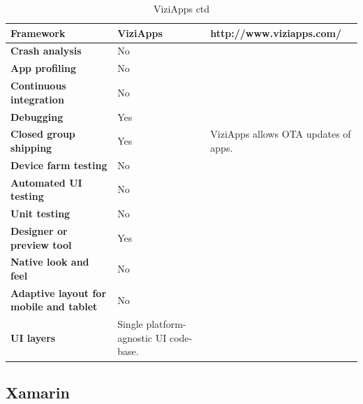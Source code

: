 \documentclass[english,master,public,dept460,male,cpdeclaration,oneside]{diploma}
\begin{document}
\begin{table}[!h]
	\centering
	\caption{ViziApps ctd}
	\begin{tabular}{p{} | p{} | p{}}
		\toprule		
		\textbf{Framework} & \textbf{ViziApps} & http://www.viziapps.com/ \\
		\midrule
		\textbf{Crash analysis} & No & \\			
		\midrule
		\textbf{App profiling} & No & \\			
		\midrule
		\textbf{Continuous integration} & No & \\			
		\midrule
		\textbf{Debugging} & Yes & \\			
		\midrule
		\textbf{Closed group shipping} & Yes & ViziApps allows OTA updates of apps. \\			
		\midrule
		\textbf{Device farm testing} & No & \\			
		\midrule
		\textbf{Automated UI testing} & No & \\			
		\midrule
		\textbf{Unit testing} & No & \\			
		\midrule
		\textbf{Designer or preview tool} & Yes & \\			
		\midrule
		\textbf{Native look and feel} & No & \\			
		\midrule
		\textbf{Adaptive layout for mobile and tablet} & No & \\			
		\midrule		
		\textbf{UI layers} & Single platform-agnostic UI code-base. & \\			
		\midrule
	\end{tabular}
\end{table}

\clearpage
\subsection{Xamarin}
\end{document}
